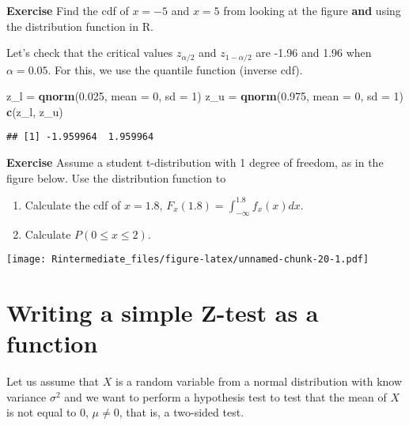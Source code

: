 \documentclass[]{article}
\newenvironment{Shaded}{\begin{snugshade}}{\end{snugshade}}
\newcommand{\KeywordTok}[1]{\textcolor[rgb]{0.13,0.29,0.53}{\textbf{#1}}}
\newcommand{\DataTypeTok}[1]{\textcolor[rgb]{0.13,0.29,0.53}{#1}}
\newcommand{\DecValTok}[1]{\textcolor[rgb]{0.00,0.00,0.81}{#1}}
\newcommand{\FloatTok}[1]{\textcolor[rgb]{0.00,0.00,0.81}{#1}}
\newcommand{\StringTok}[1]{\textcolor[rgb]{0.31,0.60,0.02}{#1}}
\newcommand{\NormalTok}[1]{#1}
\providecommand{\tightlist}{%
  \setlength{\itemsep}{0pt}\setlength{\parskip}{0pt}}
\begin{document}
\textbf{Exercise} Find the cdf of \(x=-5\) and \(x=5\) from looking at
the figure \textbf{and} using the distribution function in R.

\begingroup\color{dg}

\endgroup

Let's check that the critical values \(z_{\alpha/2}\) and
\(z_{1-\alpha/2}\) are -1.96 and 1.96 when \(\alpha = 0.05\). For this,
we use the quantile function (inverse cdf).

\begin{Shaded}
\begin{Highlighting}[]
\NormalTok{z_l =}\StringTok{ }\KeywordTok{qnorm}\NormalTok{(}\FloatTok{0.025}\NormalTok{, }\DataTypeTok{mean =} \DecValTok{0}\NormalTok{, }\DataTypeTok{sd =} \DecValTok{1}\NormalTok{)}
\NormalTok{z_u =}\StringTok{ }\KeywordTok{qnorm}\NormalTok{(}\FloatTok{0.975}\NormalTok{, }\DataTypeTok{mean =} \DecValTok{0}\NormalTok{, }\DataTypeTok{sd =} \DecValTok{1}\NormalTok{)}
\KeywordTok{c}\NormalTok{(z_l, z_u)}
\end{Highlighting}
\end{Shaded}

\begin{verbatim}
## [1] -1.959964  1.959964
\end{verbatim}

\textbf{Exercise} Assume a student t-distribution with 1 degree of
freedom, as in the figure below. Use the distribution function to

\begin{enumerate}
\def\labelenumi{\arabic{enumi}.}
\tightlist
\item
  Calculate the cdf of \(x=1.8\),
  \(F_x(1.8) = \int_{-\infty}^{1.8} f_x(x)dx\). 
\item
  Calculate \(P(0\leq x \leq 2)\).
\end{enumerate}

\begingroup\color{dg}

\endgroup

\texttt{[image: Rintermediate\_files/figure-latex/unnamed-chunk-20-1.pdf]}

\section{Writing a simple Z-test as a
function}\label{writing-a-simple-z-test-as-a-function}

Let us assume that \(X\) is a random variable from a normal distribution
with know variance \(\sigma^2\) and we want to perform a hypothesis test
to test that the mean of \(X\) is not equal to \(0\), \(\mu\neq 0\),
that is, a two-sided test.
\end{document}
